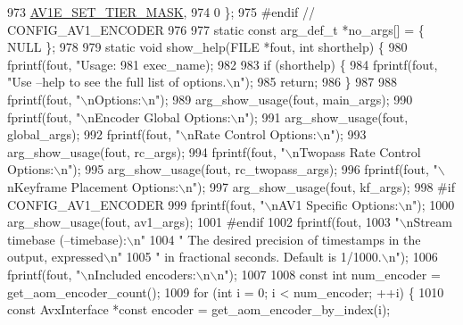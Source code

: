 \begin{DoxyCodeInclude}
{{{{{{{973                                         \hyperlink{group__aom__encoder_ggae78dde67a6d78f332e9bdba0dde42db5a8a9265ce765bdcf9df119a7e5c7b3cc7}{AV1E\_SET\_TIER\_MASK},
974                                         0 \};
975 \textcolor{preprocessor}{#endif  // CONFIG\_AV1\_ENCODER}
976 
977 \textcolor{keyword}{static} \textcolor{keyword}{const} arg\_def\_t *no\_args[] = \{ NULL \};
978 
979 \textcolor{keyword}{static} \textcolor{keywordtype}{void} show\_help(FILE *fout, \textcolor{keywordtype}{int} shorthelp) \{
980   fprintf(fout, \textcolor{stringliteral}{"Usage: %
981           exec\_name);
982 
983   \textcolor{keywordflow}{if} (shorthelp) \{
984     fprintf(fout, \textcolor{stringliteral}{"Use --help to see the full list of options.\(\backslash\)n"});
985     \textcolor{keywordflow}{return};
986   \}
987 
988   fprintf(fout, \textcolor{stringliteral}{"\(\backslash\)nOptions:\(\backslash\)n"});
989   arg\_show\_usage(fout, main\_args);
990   fprintf(fout, \textcolor{stringliteral}{"\(\backslash\)nEncoder Global Options:\(\backslash\)n"});
991   arg\_show\_usage(fout, global\_args);
992   fprintf(fout, \textcolor{stringliteral}{"\(\backslash\)nRate Control Options:\(\backslash\)n"});
993   arg\_show\_usage(fout, rc\_args);
994   fprintf(fout, \textcolor{stringliteral}{"\(\backslash\)nTwopass Rate Control Options:\(\backslash\)n"});
995   arg\_show\_usage(fout, rc\_twopass\_args);
996   fprintf(fout, \textcolor{stringliteral}{"\(\backslash\)nKeyframe Placement Options:\(\backslash\)n"});
997   arg\_show\_usage(fout, kf\_args);
998 \textcolor{preprocessor}{#if CONFIG\_AV1\_ENCODER}
999   fprintf(fout, \textcolor{stringliteral}{"\(\backslash\)nAV1 Specific Options:\(\backslash\)n"});
1000   arg\_show\_usage(fout, av1\_args);
1001 \textcolor{preprocessor}{#endif}
1002   fprintf(fout,
1003           \textcolor{stringliteral}{"\(\backslash\)nStream timebase (--timebase):\(\backslash\)n"}
1004           \textcolor{stringliteral}{"  The desired precision of timestamps in the output, expressed\(\backslash\)n"}
1005           \textcolor{stringliteral}{"  in fractional seconds. Default is 1/1000.\(\backslash\)n"});
1006   fprintf(fout, \textcolor{stringliteral}{"\(\backslash\)nIncluded encoders:\(\backslash\)n\(\backslash\)n"});
1007 
1008   \textcolor{keyword}{const} \textcolor{keywordtype}{int} num\_encoder = get\_aom\_encoder\_count();
1009   \textcolor{keywordflow}{for} (\textcolor{keywordtype}{int} i = 0; i < num\_encoder; ++i) \{
1010     \textcolor{keyword}{const} AvxInterface *\textcolor{keyword}{const} encoder = get\_aom\_encoder\_by\_index(i);
}}}}}}}}
\end{DoxyCodeInclude}
